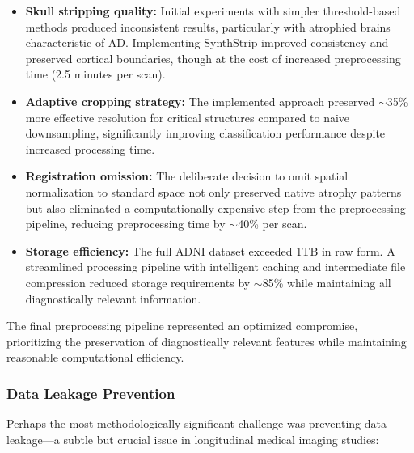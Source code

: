 \documentclass[12pt, a4paper]{article}
\begin{document}
\begin{itemize}
    \item \textbf{Skull stripping quality:} Initial experiments with simpler threshold-based methods produced inconsistent results, particularly with atrophied brains characteristic of AD. Implementing SynthStrip improved consistency and preserved cortical boundaries, though at the cost of increased preprocessing time (2.5 minutes per scan).
    
    \item \textbf{Adaptive cropping strategy:} The implemented approach preserved $\sim$35\% more effective resolution for critical structures compared to naive downsampling, significantly improving classification performance despite increased processing time.
    
    \item \textbf{Registration omission:} The deliberate decision to omit spatial normalization to standard space not only preserved native atrophy patterns but also eliminated a computationally expensive step from the preprocessing pipeline, reducing preprocessing time by $\sim$40\% per scan.
    
    \item \textbf{Storage efficiency:} The full ADNI dataset exceeded 1TB in raw form. A streamlined processing pipeline with intelligent caching and intermediate file compression reduced storage requirements by $\sim$85\% while maintaining all diagnostically relevant information.
\end{itemize}

The final preprocessing pipeline represented an optimized compromise, prioritizing the preservation of diagnostically relevant features while maintaining reasonable computational efficiency.

\subsubsection{Data Leakage Prevention}

Perhaps the most methodologically significant challenge was preventing data leakage—a subtle but crucial issue in longitudinal medical imaging studies:
\end{document}
